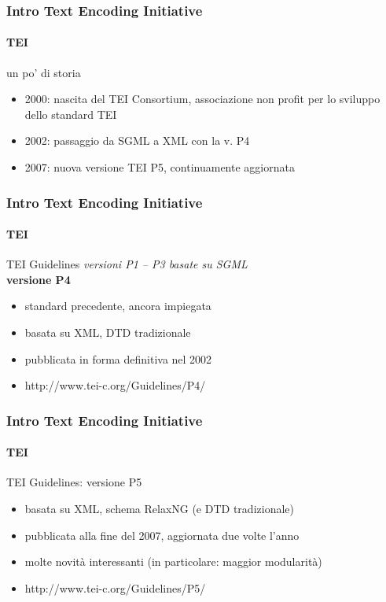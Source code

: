 \begin{frame}
	\frametitle{Intro Text Encoding Initiative}
	\framesubtitle{TEI}
	\addtocounter{nframe}{1}

	\begin{block}{un po' di storia}
		\begin{itemize}
			\item 2000: nascita del TEI Consortium, associazione non profit per lo sviluppo dello standard TEI
			\item 2002: passaggio da SGML a XML con la v. P4
			\item 2007: nuova versione TEI P5, continuamente aggiornata
		\end{itemize}
	\end{block}

\end{frame}


\begin{frame}
	\frametitle{Intro Text Encoding Initiative}
	\framesubtitle{TEI}
	\addtocounter{nframe}{1}

	\begin{block}{TEI Guidelines}
		\textit{versioni P1 – P3 basate su SGML}
		\\\textbf{versione P4}
		\begin{itemize}
			\item standard precedente, ancora impiegata
			\item basata su XML, DTD tradizionale
			\item pubblicata in forma definitiva nel 2002
			\item http://www.tei-c.org/Guidelines/P4/
		\end{itemize}
	\end{block}

\end{frame}

\begin{frame}
	\frametitle{Intro Text Encoding Initiative}
	\framesubtitle{TEI}
	\addtocounter{nframe}{1}

	\begin{block}{TEI Guidelines: versione P5}
		\begin{itemize}
			\item basata su XML, schema RelaxNG (e DTD tradizionale)
			\item pubblicata alla fine del 2007, aggiornata due volte l’anno
			\item molte novità interessanti (in particolare: maggior modularità)
			\item  http://www.tei-c.org/Guidelines/P5/
		\end{itemize}
	\end{block}

\end{frame}


